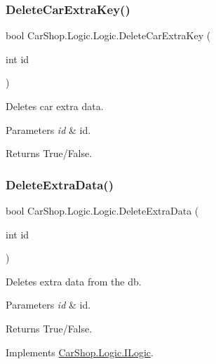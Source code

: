 \subsubsection{\texorpdfstring{Delete\+Car\+Extra\+Key()}{DeleteCarExtraKey()}}
{\footnotesize\ttfamily bool Car\+Shop.\+Logic.\+Logic.\+Delete\+Car\+Extra\+Key (\begin{DoxyParamCaption}\item[{int}]{id }\end{DoxyParamCaption})}



Deletes car extra data. 


\begin{DoxyParams}{Parameters}
{\em id} & id.\\
\hline
\end{DoxyParams}
\begin{DoxyReturn}{Returns}
True/\+False.
\end{DoxyReturn}
\mbox{\label{class_car_shop_1_1_logic_1_1_logic_ac032e87056e5879f8308bc028577dce3}} 
\subsubsection{\texorpdfstring{Delete\+Extra\+Data()}{DeleteExtraData()}}
{\footnotesize\ttfamily bool Car\+Shop.\+Logic.\+Logic.\+Delete\+Extra\+Data (\begin{DoxyParamCaption}\item[{int}]{id }\end{DoxyParamCaption})}



Deletes extra data from the db. 


\begin{DoxyParams}{Parameters}
{\em id} & id.\\
\hline
\end{DoxyParams}
\begin{DoxyReturn}{Returns}
True/\+False.
\end{DoxyReturn}


Implements \mbox{\hyperlink{interface_car_shop_1_1_logic_1_1_i_logic_a224a696141bf86a3f16c8ef9d5d4832b}{Car\+Shop.\+Logic.\+I\+Logic}}.

\mbox{\label{class_car_shop_1_1_logic_1_1_logic_a9e52939189a58e143da94181d3d23c9c}} 
